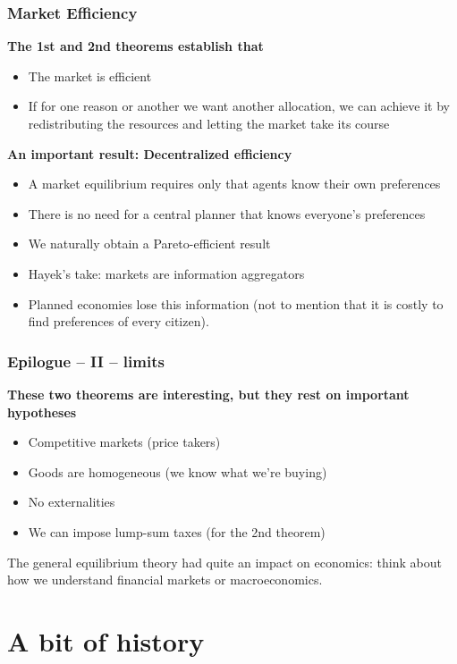 \documentclass[handout]{beamer}
\newenvironment{iPar}[1]{\textbf{#1} \begin{itemize}}{\end{itemize}}
\newcommand{\mdp}{\medskip \pause}
\begin{document}
\begin{frame}\frametitle{Market Efficiency}
\begin{iPar}{The 1st and 2nd theorems establish that} \item
The market is efficient \item If for one reason or another we want another allocation, we can achieve it by redistributing the resources and letting the market take its course  \end{iPar}\mdp

\begin{iPar}{An important result: Decentralized efficiency} \item A market equilibrium requires only that agents know their own preferences   \item There is no need for a central planner that knows everyone's preferences \item We naturally obtain a Pareto-efficient result \item
Hayek's take: markets are information aggregators \item Planned economies lose this information (not to mention that it is costly to find  preferences of every citizen). 
\end{iPar}

\end{frame}

\begin{frame}\frametitle{Epilogue -- II -- limits}

\begin{iPar}{These two theorems are interesting, but they rest on important hypotheses} 
\item Competitive markets (price takers) \item Goods are homogeneous (we know what we're buying) \item No externalities
\item We can impose lump-sum taxes (for the 2nd theorem)\end{iPar}\mdp

The general equilibrium theory had quite an impact on economics: think about how we understand financial markets or macroeconomics. 

\end{frame}

\section{A bit of history}
\end{document}
